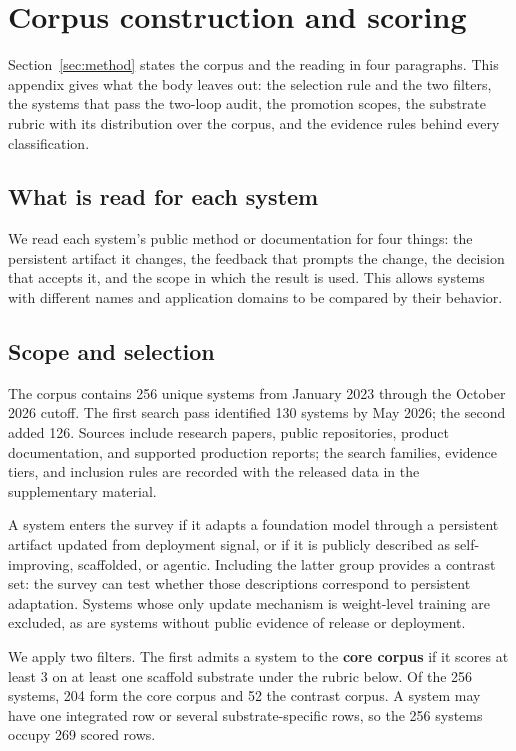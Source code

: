 \section{Corpus construction and scoring}\label{app:corpus}

Section~\ref{sec:method} states the corpus and the reading in four paragraphs. This appendix gives what the body leaves out: the selection rule and the two filters, the systems that pass the two-loop audit, the promotion scopes, the substrate rubric with its distribution over the corpus, and the evidence rules behind every classification.

\subsection{What is read for each system}\label{what-is-read-for-each-system}

We read each system's public method or documentation for four things: the persistent artifact it changes, the feedback that prompts the change, the decision that accepts it, and the scope in which the result is used. This allows systems with different names and application domains to be compared by their behavior.

\subsection{Scope and selection}\label{scope-and-selection}

The corpus contains 256 unique systems from January 2023 through the October 2026 cutoff. The first search pass identified 130 systems by May 2026; the second added 126. Sources include research papers, public repositories, product documentation, and supported production reports; the search families, evidence tiers, and inclusion rules are recorded with the released data in the supplementary material.

A system enters the survey if it adapts a foundation model through a persistent artifact updated from deployment signal, or if it is publicly described as self-improving, scaffolded, or agentic. Including the latter group provides a contrast set: the survey can test whether those descriptions correspond to persistent adaptation. Systems whose only update mechanism is weight-level training are excluded, as are systems without public evidence of release or deployment.

We apply two filters. The first admits a system to the \textbf{core corpus} if it scores at least 3 on at least one scaffold substrate under the rubric below. Of the 256 systems, 204 form the core corpus and 52 the contrast corpus. A system may have one integrated row or several substrate-specific rows, so the 256 systems occupy 269 scored rows.


